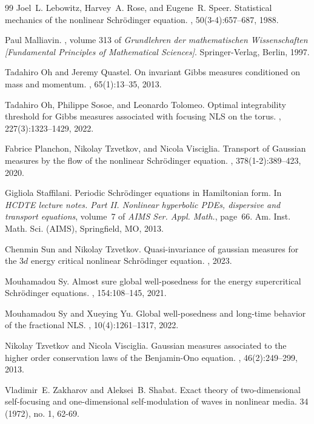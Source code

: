 \documentclass[11pt,leqno]{amsart}
\begin{document}
\begin{thebibliography}{99}
Joel~L. Lebowitz, Harvey~A. Rose, and Eugene~R. Speer.
\newblock Statistical mechanics of the nonlinear {S}chr\"odinger equation.
, 50(3-4):657--687, 1988.

Paul Malliavin.
, volume 313 of {\em Grundlehren der
  mathematischen Wissenschaften [Fundamental Principles of Mathematical
  Sciences]}.
\newblock Springer-Verlag, Berlin, 1997.

Tadahiro Oh and Jeremy Quastel.
\newblock On invariant {G}ibbs measures conditioned on mass and momentum.
, 65(1):13--35, 2013.

Tadahiro Oh, Philippe Sosoe, and Leonardo Tolomeo.
\newblock Optimal integrability threshold for {G}ibbs measures associated with
  focusing {NLS} on the torus.
, 227(3):1323--1429, 2022.

Fabrice Planchon, Nikolay Tzvetkov, and Nicola Visciglia.
\newblock Transport of {G}aussian measures by the flow of the nonlinear
  {S}chr\"odinger equation.
, 378(1-2):389--423, 2020.

Gigliola Staffilani.
\newblock Periodic {S}chr\"odinger equations in {H}amiltonian form.
\newblock In {\em H{CDTE} lecture notes. {P}art {II}. {N}onlinear hyperbolic
  {PDE}s, dispersive and transport equations}, volume~7 of {\em AIMS Ser. Appl.
  Math.}, page~66. Am. Inst. Math. Sci. (AIMS), Springfield, MO, 2013.

Chenmin Sun and Nikolay Tzvetkov.
\newblock Quasi-invariance of gaussian measures for the $3 d $ energy critical
  nonlinear Schr\" odinger equation.
, 2023.

Mouhamadou Sy.
\newblock Almost sure global well-posedness for the energy supercritical
  {S}chr\"odinger equations.
, 154:108--145, 2021.

Mouhamadou Sy and Xueying Yu.
\newblock Global well-posedness and long-time behavior of the fractional {NLS}.
, 10(4):1261--1317,
  2022.

Nikolay Tzvetkov and Nicola Visciglia.
\newblock Gaussian measures associated to the higher order conservation laws of
  the {B}enjamin-{O}no equation.
, 46(2):249--299, 2013.

Vladimir~E. Zakharov and Aleksei~B. Shabat.
\newblock Exact theory of two-dimensional self-focusing and one-dimensional
  self-modulation of waves in nonlinear media. 
 34 (1972), no. 1, 62-69.

\end{thebibliography}
\end{document}
